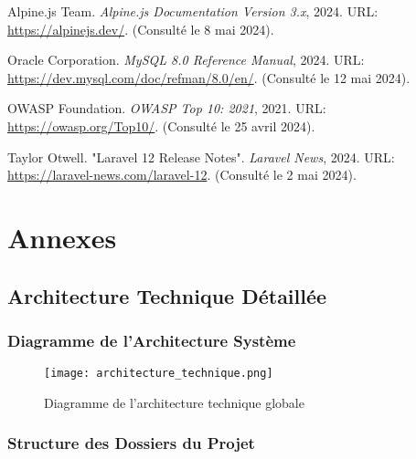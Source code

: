 \documentclass[12pt,a4paper]{report}
\begin{document}
\begin{thebibliography}{99}
Alpine.js Team.
\newblock \textit{Alpine.js Documentation Version 3.x}, 2024.
\newblock URL: \url{https://alpinejs.dev/}.
\newblock (Consulté le 8 mai 2024).

Oracle Corporation.
\newblock \textit{MySQL 8.0 Reference Manual}, 2024.
\newblock URL: \url{https://dev.mysql.com/doc/refman/8.0/en/}.
\newblock (Consulté le 12 mai 2024).

OWASP Foundation.
\newblock \textit{OWASP Top 10: 2021}, 2021.
\newblock URL: \url{https://owasp.org/Top10/}.
\newblock (Consulté le 25 avril 2024).

Taylor Otwell.
\newblock "Laravel 12 Release Notes".
\newblock \textit{Laravel News}, 2024.
\newblock URL: \url{https://laravel-news.com/laravel-12}.
\newblock (Consulté le 2 mai 2024).


\end{thebibliography}

\appendix
\part{Annexes}

\chapter{Architecture Technique Détaillée}











\section{Diagramme de l'Architecture Système}

\begin{figure}[h!]
    \centering
    \texttt{[image: architecture\_technique.png]}
    \caption{Diagramme de l'architecture technique globale}
    \label{fig:architecture_technique_annexe}
\end{figure}






\section{Structure des Dossiers du Projet}
\end{document}
